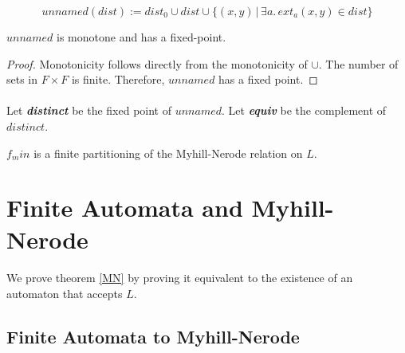 \documentclass[11pt,a4paper,oneside]{book}
\begin{document}
            \begin{definition}
                \[
                    unnamed(dist) := dist_0 \cup dist \cup \{ (x,y) \, | \, \exists a. \, ext_a(x,y) \in dist\}
                \]
            \end{definition}

            \begin{lemma}
                \label{dist_monotone}
                $unnamed$ is monotone and has a fixed-point.
            \end{lemma}
            \begin{proof}
                Monotonicity follows directly from the monotonicity of $\cup$. 
                The number of sets in $F \times F$ is finite. 
                Therefore, $unnamed$ has a fixed point.

            \end{proof}
            \paragraph{}
                Let \textit{\textbf{distinct}} be the fixed point of $unnamed$.
                Let \textit{\textbf{equiv}} be the complement of $distinct$.
                \begin{theorem}
                    \label{MN_MIN}
                    $f_min$ is a finite partitioning of the Myhill-Nerode relation on $L$.
                \end{theorem}




    \section{Finite Automata and Myhill-Nerode}

        \paragraph{}
            We prove theorem \ref{MN} by proving it equivalent to the existence of an automaton that accepts $L$.
            

        
        \subsection{Finite Automata to Myhill-Nerode}
\end{document}
